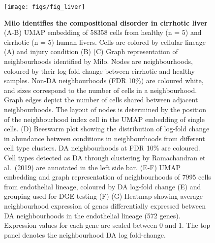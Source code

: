 \documentclass[
  10pt,
]{article}
\begin{document}
\begin{figure}[ht]
\texttt{[image: figs/fig\_liver]} \caption{\textbf{Milo identifies the compositional disorder in cirrhotic liver}
(A-B) UMAP embedding of 58358 cells from healthy (n = 5) and cirrhotic (n = 5) human livers. Cells are colored by cellular lineage (A) and injury condition (B)
(C) Graph representation of neighbourhoods identified by Milo. Nodes are neighbourhoods, coloured by their log fold change between cirrhotic and healthy samples. Non-DA neighbourhoods (FDR 10\%) are coloured white, and sizes correspond to the number of cells in a neighbourhood. Graph edges depict the number of cells shared between adjacent neighbourhoods. The layout of nodes is determined by the position of the neighbourhood index cell in the UMAP embedding of single cells. (D) Beeswarm plot showing the distribution of log-fold change in abundance between conditions in neighbourhoods from different cell type clusters. DA neighbourhoods at FDR 10\% are coloured. Cell types detected as DA through clustering by Ramachandran et al.~(2019) are annotated in the left side bar. (E-F) UMAP embedding and graph representation of neighbourhoods of 7995 cells from endothelial lineage, coloured by DA log-fold change (E) and grouping used for DGE testing (F) (G) Heatmap showing average neighbourhood expression of genes differentially expressed between DA neighbourhoods in the endothelial lineage (572 genes). Expression values for each gene are scaled between 0 and 1. The top panel denotes the neighbourhood DA log fold-change.}\label{fig:fig-5}
\end{figure}
\end{document}
